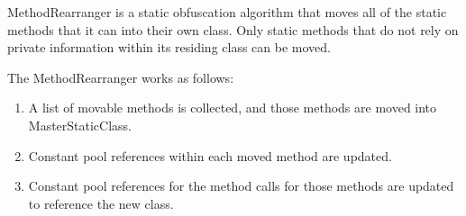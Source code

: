MethodRearranger is a static obfuscation algorithm that moves
all of the static methods that it can into their own class.
Only static methods that do not rely on private information within
its residing class can be moved.

The MethodRearranger works as follows:
\begin{enumerate}
\item A list of movable methods is collected, and those methods
are moved into MasterStaticClass.
\item Constant pool references within each moved method are updated.
\item Constant pool references for the method calls for those methods
are updated to reference the new class.
\end{enumerate}